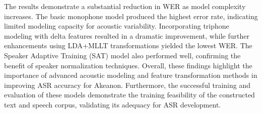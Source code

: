 The results demonstrate a substantial reduction in WER as model complexity increases. The basic monophone model produced the highest error rate, indicating limited modeling capacity for acoustic variability. Incorporating triphone modeling with delta features resulted in a dramatic improvement, while further enhancements using LDA+MLLT transformations yielded the lowest WER. The Speaker Adaptive Training (SAT) model also performed well, confirming the benefit of speaker normalization techniques. Overall, these findings highlight the importance of advanced acoustic modeling and feature transformation methods in improving ASR accuracy for Akeanon. Furthermore, the successful training and evaluation of these models demonstrate the training feasibility of the constructed text and speech corpus, validating its adequacy for ASR development.
